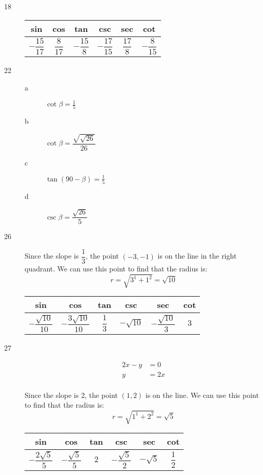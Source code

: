 \documentclass[fleqn,addpoints]{exam}
\begin{document}
\begin{description}
\item[18]
\begin{tabular}{cccccc}
\toprule
sin & cos & tan & csc & sec & cot \\
\midrule
  $-\dfrac{15}{17}$ &  $\dfrac{8}{17}$ & $- \dfrac{15}{8}$ & $-\dfrac{17}{15}$ & $\dfrac{17}{8}$ & $-\dfrac{8}{15}$ \\
\bottomrule
\end{tabular}

\item[22]
\begin{description}
\item[a] $\cot \beta = \frac{1}{5}$

\item[b] $\cot \beta = \dfrac{\sqrt{\sqrt{26}}}{26}$

\item[c] $\tan (90 - \beta) = \frac{1}{5}$

\item[d] $\csc \beta = \dfrac{\sqrt{26}}{5}$

\end{description}

\item[26]

Since the slope is $\dfrac{1}{3}$, the point $(-3, -1)$ is on the line in the right quadrant.  We can use this point to
find that the radius is: 
\[
  r = \sqrt{3^1 + 1^2} = \sqrt{10}
\]

\begin{tabular}{cccccc}
\toprule
sin & cos & tan & csc & sec & cot \\
\midrule
  $-\dfrac{\sqrt{10}}{10}$ &  $-\dfrac{3 \sqrt{10}}{10}$ & $\dfrac{1}{3}$ & $-\sqrt{10}$ & $-\dfrac{\sqrt{10}}{3}$ & $3$ \\
\bottomrule
\end{tabular}

\item[27]
\begin{align*}
  2x - y &= 0 \\
  y &= 2x \\
\end{align*}

Since the slope is $2$, the point $(1, 2)$ is on the line.  We can use this point to find that the radius is:
\[
  r = \sqrt{1^1 + 2^2} = \sqrt{5}
\]

\begin{tabular}{cccccc}
\toprule
sin & cos & tan & csc & sec & cot \\
\midrule
  $-\dfrac{2 \sqrt{5}}{5}$ & $-\dfrac{\sqrt{5}}{5}$ & $2$ & $- \dfrac{\sqrt{5}}{2}$ & $-\sqrt{5}$ & $\dfrac{1}{2}$ \\
\bottomrule
\end{tabular}


\end{description}
\end{document}
